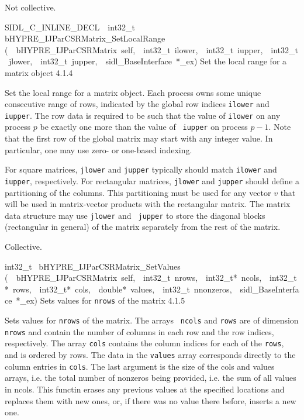 \documentclass{article}
\begin{document}
\begin{cxxentry}
\begin{cxxentry}
\begin{cxxfunction}
\begin{cxxdoc}
Not collective.
\end{cxxdoc}
\end{cxxfunction}
\begin{cxxfunction}
{SIDL\_C\_INLINE\_DECL\ \ int32\_t\ }
        {bHYPRE\_IJParCSRMatrix\_SetLocalRange}
        {(\ \ bHYPRE\_IJParCSRMatrix\ self,\ \ int32\_t\ ilower,\ \ int32\_t\ iupper,\ \ int32\_t\ jlower,\ \ int32\_t\ jupper,\ \ sidl\_BaseInterface\ *\_ex)}
        {
Set the local range for a matrix object}
        {4.1.4}
\begin{cxxdoc}

Set the local range for a matrix object.  Each process owns
some unique consecutive range of rows, indicated by the
global row indices {\tt ilower} and {\tt iupper}.  The row
data is required to be such that the value of {\tt ilower} on
any process $p$ be exactly one more than the value of {\tt
iupper} on process $p-1$.  Note that the first row of the
global matrix may start with any integer value.  In
particular, one may use zero- or one-based indexing.

For square matrices, {\tt jlower} and {\tt jupper} typically
should match {\tt ilower} and {\tt iupper}, respectively.
For rectangular matrices, {\tt jlower} and {\tt jupper}
should define a partitioning of the columns.  This
partitioning must be used for any vector $v$ that will be
used in matrix-vector products with the rectangular matrix.
The matrix data structure may use {\tt jlower} and {\tt
jupper} to store the diagonal blocks (rectangular in general)
of the matrix separately from the rest of the matrix.

Collective.
\end{cxxdoc}
\end{cxxfunction}
\begin{cxxfunction}
{int32\_t\ }
        {bHYPRE\_IJParCSRMatrix\_SetValues}
        {(\ \ bHYPRE\_IJParCSRMatrix\ self,\ \ int32\_t\ nrows,\ \ int32\_t*\ ncols,\ \ int32\_t*\ rows,\ \ int32\_t*\ cols,\ \ double*\ values,\ \ int32\_t\ nnonzeros,\ \ sidl\_BaseInterface\ *\_ex)}
        {
Sets values for {\tt nrows} of the matrix}
        {4.1.5}
\begin{cxxdoc}

Sets values for {\tt nrows} of the matrix.  The arrays {\tt
ncols} and {\tt rows} are of dimension {\tt nrows} and
contain the number of columns in each row and the row
indices, respectively.  The array {\tt cols} contains the
column indices for each of the {\tt rows}, and is ordered by
rows.  The data in the {\tt values} array corresponds
directly to the column entries in {\tt cols}.  The last argument
is the size of the cols and values arrays, i.e. the total number
of nonzeros being provided, i.e. the sum of all values in ncols.
This functin erases any previous values at the specified locations and
replaces them with new ones, or, if there was no value there before,
inserts a new one.


\end{cxxdoc}
\end{cxxfunction}
\end{cxxentry}
\end{cxxentry}
\end{document}
